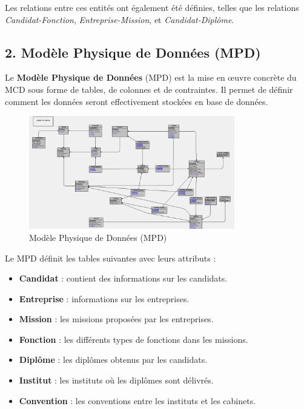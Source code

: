 \documentclass[a4paper,12pt]{article}
\begin{document}
Les relations entre ces entités ont également été définies, telles que les relations \textit{Candidat-Fonction}, \textit{Entreprise-Mission}, et \textit{Candidat-Diplôme}.

\subsection*{2. Modèle Physique de Données (MPD)}

Le \textbf{Modèle Physique de Données} (MPD) est la mise en œuvre concrète du MCD sous forme de tables, de colonnes et de contraintes. Il permet de définir comment les données seront effectivement stockées en base de données.

\begin{figure}[h!]
    \centering
    \includegraphics[width=0.8\textwidth]{MPD.png} %
    \caption{Modèle Physique de Données (MPD)}
    \label{fig:mpd}
\end{figure}

\noindent
Le MPD définit les tables suivantes avec leurs attributs :
\begin{itemize}
    \item \textbf{Candidat} : contient des informations sur les candidats.
    \item \textbf{Entreprise} : informations sur les entreprises.
    \item \textbf{Mission} : les missions proposées par les entreprises.
    \item \textbf{Fonction} : les différents types de fonctions dans les missions.
    \item \textbf{Diplôme} : les diplômes obtenus par les candidats.
    \item \textbf{Institut} : les instituts où les diplômes sont délivrés.
    \item \textbf{Convention} : les conventions entre les instituts et les cabinets.
\end{itemize}
\end{document}
